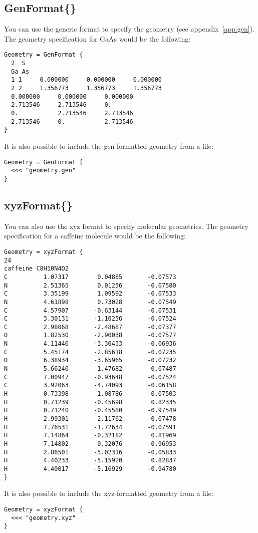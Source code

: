 \subsection{GenFormat\{\}}
\label{sec:dftbp.GenFormat}

You can use the generic format to specify the geometry (see
appendix~\ref{app:gen}). The geometry specification for GaAs would be
the following:
\begin{verbatim}
Geometry = GenFormat {
  2  S
  Ga As
  1 1     0.000000     0.000000     0.000000
  2 2     1.356773     1.356773     1.356773
  0.000000     0.000000     0.000000
  2.713546     2.713546     0.
  0.           2.713546     2.713546
  2.713546     0.           2.713546
}
\end{verbatim}
It is also possible to include the gen-formatted geometry from a file:
\begin{verbatim}
Geometry = GenFormat {
  <<< "geometry.gen"
}
\end{verbatim}

\subsection{xyzFormat\{\}}
\label{sec:dftbp.xyzFormat}

You can also use the xyz format to specify molecular geometries.
The geometry specification for a caffeine molecule would be the following:
\begin{verbatim}
Geometry = xyzFormat {
24
caffeine C8H10N4O2
C          1.07317        0.04885       -0.07573
N          2.51365        0.01256       -0.07580
C          3.35199        1.09592       -0.07533
N          4.61898        0.73028       -0.07549
C          4.57907       -0.63144       -0.07531
C          3.30131       -1.10256       -0.07524
C          2.98068       -2.48687       -0.07377
O          1.82530       -2.90038       -0.07577
N          4.11440       -3.30433       -0.06936
C          5.45174       -2.85618       -0.07235
O          6.38934       -3.65965       -0.07232
N          5.66240       -1.47682       -0.07487
C          7.00947       -0.93648       -0.07524
C          3.92063       -4.74093       -0.06158
H          0.73398        1.08786       -0.07503
H          0.71239       -0.45698        0.82335
H          0.71240       -0.45580       -0.97549
H          2.99301        2.11762       -0.07478
H          7.76531       -1.72634       -0.07591
H          7.14864       -0.32182        0.81969
H          7.14802       -0.32076       -0.96953
H          2.86501       -5.02316       -0.05833
H          4.40233       -5.15920        0.82837
H          4.40017       -5.16929       -0.94780
}
\end{verbatim}
It is also possible to include the xyz-formatted geometry from a file:
\begin{verbatim}
Geometry = xyzFormat {
  <<< "geometry.xyz"
}
\end{verbatim}


